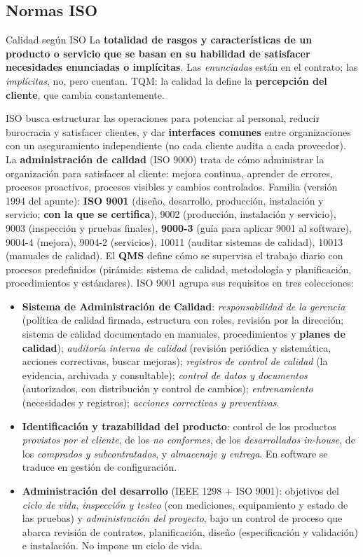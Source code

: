 \documentclass[11pt,a4paper]{article}
\begin{document}
\subsection{Normas ISO}
\begin{defbox}{Calidad según ISO}
La \textbf{totalidad de rasgos y características de un producto o servicio que se basan en su habilidad de
satisfacer necesidades enunciadas o implícitas}. Las \emph{enunciadas} están en el contrato; las
\emph{implícitas}, no, pero cuentan. TQM: la calidad la define la \textbf{percepción del cliente}, que cambia
constantemente.
\end{defbox}
ISO busca estructurar las operaciones para potenciar al personal, reducir burocracia y satisfacer clientes, y
dar \textbf{interfaces comunes} entre organizaciones con un aseguramiento independiente (no cada cliente audita
a cada proveedor). La \textbf{administración de calidad} (ISO 9000) trata de cómo administrar la organización
para satisfacer al cliente: mejora continua, aprender de errores, procesos proactivos, procesos visibles y
cambios controlados. Familia (versión 1994 del apunte): \textbf{ISO 9001} (diseño, desarrollo, producción,
instalación y servicio; \textbf{con la que se certifica}), 9002 (producción, instalación y servicio), 9003
(inspección y pruebas finales), \textbf{9000-3} (guía para aplicar 9001 al software), 9004-4 (mejora), 9004-2
(servicios), 10011 (auditar sistemas de calidad), 10013 (manuales de calidad).
El \textbf{QMS} define cómo se supervisa el trabajo diario con procesos predefinidos (pirámide: sistema de
calidad, metodología y planificación, procedimientos y estándares). ISO 9001 agrupa sus requisitos en tres
colecciones:
\begin{itemize}
  \item \textbf{Sistema de Administración de Calidad}: \emph{responsabilidad de la gerencia} (política de
  calidad firmada, estructura con roles, revisión por la dirección; sistema de calidad documentado en manuales,
  procedimientos y \textbf{planes de calidad}); \emph{auditoría interna de calidad} (revisión periódica y
  sistemática, acciones correctivas, buscar mejoras); \emph{registros de control de calidad} (la evidencia,
  archivada y consultable); \emph{control de datos y documentos} (autorizados, con distribución y control de
  cambios); \emph{entrenamiento} (necesidades y registros); \emph{acciones correctivas y preventivas}.
  \item \textbf{Identificación y trazabilidad del producto}: control de los productos \emph{provistos por el
  cliente}, de los \emph{no conformes}, de los \emph{desarrollados in-house}, de los \emph{comprados y
  subcontratados}, y \emph{almacenaje y entrega}. En software se traduce en gestión de configuración.
  \item \textbf{Administración del desarrollo} (IEEE 1298 $+$ ISO 9001): objetivos del \emph{ciclo de vida},
  \emph{inspección y testeo} (con mediciones, equipamiento y estado de las pruebas) y \emph{administración del
  proyecto}, bajo un control de proceso que abarca revisión de contratos, planificación, diseño (especificación
  y validación) e instalación. No impone un ciclo de vida.
\end{itemize}
\end{document}
